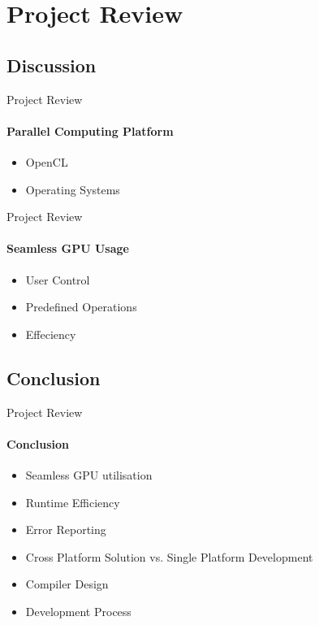 \section{Project Review}

	\subsection{Discussion}
	\begin{frame}[t]{Project Review}\framesubtitle{Parallel Computing Platform}
		\begin{itemize}
			\item OpenCL
			\item Operating Systems
		\end{itemize}
	\end{frame}

	\begin{frame}[t]{Project Review}\framesubtitle{Seamless GPU Usage}
		\begin{itemize}
			\item User Control
			\item Predefined Operations
			\item Effeciency
		\end{itemize}
	\end{frame}

	\subsection{Conclusion}
	\begin{frame}[t]{Project Review}\framesubtitle{Conclusion}
		\begin{itemize}
			\item Seamless GPU utilisation
			\item Runtime Efficiency
			\item Error Reporting
			\item Cross Platform Solution vs. Single Platform Development %
			\item Compiler Design
			\item Development Process
		\end{itemize}
	\end{frame}

